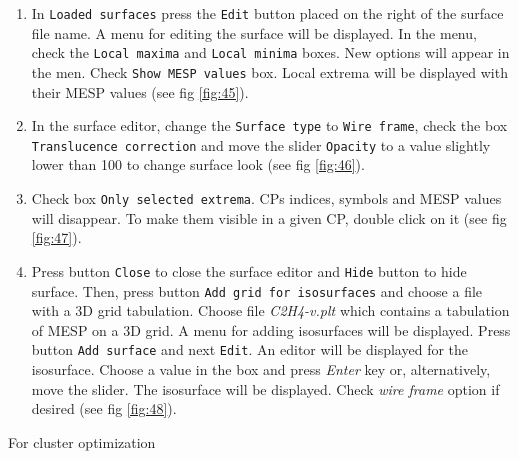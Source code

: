 \documentclass[a4paper,10pt]{article}
\begin{document}
\begin{enumerate}
\item In \texttt{Loaded surfaces} press the \texttt{Edit} button placed
on the right of the surface file name. A menu for editing the 
surface will be displayed. In the menu, check the \texttt{Local maxima} and
\texttt{Local minima} boxes. New options will appear in the men. Check
\texttt{Show MESP values} box. Local extrema will be displayed with
their MESP values (see fig \ref{fig:45}). 

\item In the surface editor, change the \texttt{Surface type}
to \texttt{Wire frame}, check the box \texttt{Translucence correction}
and move the slider \texttt{Opacity} to a value slightly lower than 100
to change surface look (see fig \ref{fig:46}). 

\item Check box \texttt{Only selected extrema}. CPs indices, symbols and 
MESP values will disappear. To make them visible in a given CP, double click 
on it (see fig \ref{fig:47}).

\item Press button \texttt{Close} to close the surface editor and \texttt{Hide}
button to hide surface. Then, press button \texttt{Add grid for isosurfaces}
and choose a file with a 3D grid tabulation. Choose file {\it C2H4-v.plt}
which contains a tabulation of MESP on a 3D grid. A menu for adding isosurfaces
will be displayed. Press button \texttt{Add surface} and next \texttt{Edit}.
An editor will be displayed for the isosurface. Choose a value in the box and
press {\it Enter} key or, alternatively, move the slider. The isosurface will
be displayed. Check {\it wire frame} option if desired (see fig \ref{fig:48}).

\end{enumerate}

\newpage

For cluster optimization
\end{document}
